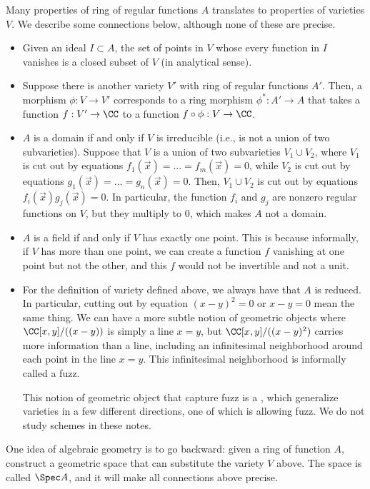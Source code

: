 Many properties of ring of regular functions $A$ 
translates to properties
of varieties $V$. We describe some connections below,
although none of these are precise.
\begin{itemize}
\item Given an ideal $I\subset A$, the set of points
in $V$ whose every function in $I$ vanishes
is a closed subset of $V$ (in analytical sense).
\item Suppose there is another variety $V'$
with ring of regular functions $A'$.
Then, a morphism $\phi : V\to V'$
corresponds to a ring morphism $\phi^* : A'\to A$
that takes a function $f : V'\to \CC$ 
to a function $f\circ\phi : V\to \CC$.
\item $A$ is a domain if and only if $V$ is irreducible
(i.e., is not a union of two subvarieties).
Suppose that $V$ is a union of two subvarieties $V_1\cup V_2$,
where $V_1$ is cut out by equations $f_1(\vec x)
= \dots = f_m(\vec x)=0$, while
$V_2$ is cut out by equations
$g_1(\vec x)= \dots = g_n(\vec x)=0$.
Then, $V_1\cup V_2$ is cut out by equations 
$f_i(\vec x)g_j(\vec x) = 0$.
In particular, the function $f_i$ and $g_j$
are nonzero regular functions on $V$,
but they multiply to $0$, which makes $A$ not a domain.
\item $A$ is a field if and only if $V$ has exactly one point.
This is because informally, if $V$ has more than one point,
we can create a function $f$ vanishing at one point
but not the other, and this $f$ would not be invertible
and not a unit.
\item For the definition of variety defined above,
we always have that $A$ is reduced.
In particular, cutting out by equation $(x-y)^2=0$
or $x-y=0$ mean the same thing. 
We can have a more subtle notion of geometric objects
where $\CC[x,y]/((x-y))$ is simply a line $x=y$,
but $\CC[x,y]/((x-y)^2)$ carries more information
than a line, including an infinitesimal neighborhood
around each point in the line $x=y$.
This infinitesimal neighborhood is informally called a fuzz.

This notion of geometric object that capture fuzz
is a , which generalize varieties in 
a few different directions, one of which is allowing fuzz.
We do not study schemes in these notes.
\end{itemize}

One idea of algebraic geometry is to go backward:
given a ring of function $A$,
construct a geometric space that can substitute
the variety $V$ above. The space is called $\Spec A$,
and it will make all connections above precise.
